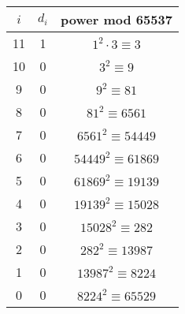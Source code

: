 \begin{center}
\begin{tabular}{c|c|c}
$i$ & $d_i$ & power mod 65537 \\\hline 
11 & 1 & $1^2 \cdot 3 \equiv 3$ \\
10 & 0 & $3^2 \equiv 9$ \\
9 & 0 & $9^2 \equiv 81$ \\
8 & 0 & $81^2 \equiv 6561$ \\
7 & 0 & $6561^2 \equiv 54449$ \\
6 & 0 & $54449^2 \equiv 61869$ \\
5 & 0 & $61869^2 \equiv 19139$ \\
4 & 0 & $19139^2 \equiv 15028$ \\
3 & 0 & $15028^2 \equiv 282$ \\
2 & 0 & $282^2 \equiv 13987$ \\
1 & 0 & $13987^2 \equiv 8224$ \\
0 & 0 & $8224^2 \equiv 65529$ \\
\end{tabular}
\end{center}

